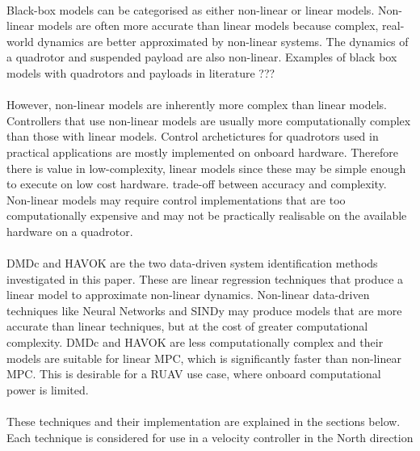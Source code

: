         \paragraph{}
        Black-box models can be categorised as either non-linear or linear models.
        Non-linear models are often more accurate than linear models because complex, real-world dynamics are better approximated by non-linear systems.
        The dynamics of a quadrotor and suspended payload are also non-linear.
        Examples of black box models with quadrotors and payloads in literature ???

        \paragraph{}
        However, non-linear models are inherently more complex than linear models. 
        Controllers that use non-linear models are usually more computationally complex than those with linear models.
        Control archetictures for quadrotors used in practical applications are mostly implemented on onboard hardware.
        Therefore there is value in low-complexity, linear models since these may be simple enough to execute on low cost hardware.
        trade-off between accuracy and complexity.
        Non-linear models may require control implementations that are too computationally expensive and may not be practically realisable on the available hardware on a quadrotor.
        
        \paragraph{}
        DMDc and HAVOK are the two data-driven system identification methods investigated in this paper. 
        These are linear regression techniques that produce a linear model to approximate non-linear dynamics.
        Non-linear data-driven techniques like Neural Networks and SINDy \cite{Brunton2016} may produce models that are more accurate than linear techniques, 
        but at the cost of greater computational complexity.
        DMDc and HAVOK are less computationally complex and their models are suitable for linear MPC, which is significantly faster than non-linear MPC.
        This is desirable for a RUAV use case, where onboard computational power is limited.
        
        \paragraph{}
        These techniques and their implementation are explained in the sections below.
        Each technique is considered for use in a velocity controller in the North direction

